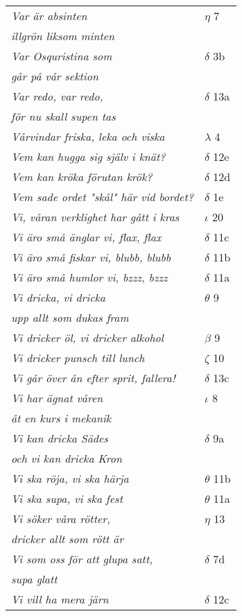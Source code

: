 \documentclass[a6paper,10pt]{article}
\begin{document}
\newpage
\setlength{\oddsidemargin}{-0.47in}
\begin{table}[!h]
\begin{tabular}{l l}
\textit{Var är absinten}	&$\eta$ 7\\
\textit{illgrön liksom minten} &\\
\textit{Var Osquristina som}	&$\delta$ 3b\\
\textit{går på vår sektion} &\\
\textit{Var redo, var redo,}	&$\delta$ 13a\\
\textit{för nu skall supen tas} &\\
\textit{Vårvindar friska, leka och viska}	&$\lambda$ 4\\
\textit{Vem kan hugga sig själv i knät?}	&$\delta$ 12e\\
\textit{Vem kan kröka förutan krök?}	&$\delta$ 12d\\
\textit{Vem sade ordet "skål" här vid bordet?}	&$\delta$ 1e\\
\textit{Vi, våran verklighet har gått i kras}&$\iota$ 20\\
\textit{Vi äro små änglar vi, flax, flax}	&$\delta$ 11c\\
\textit{Vi äro små fiskar vi, blubb, blubb}	&$\delta$ 11b\\
\textit{Vi äro små humlor vi, bzzz, bzzz}	&$\delta$ 11a\\
\textit{Vi dricka, vi dricka}	&$\theta$ 9\\
\textit{upp allt som dukas fram} &\\
\textit{Vi dricker öl, vi dricker alkohol}	&$\beta$ 9\\
\textit{Vi dricker punsch till lunch}	&$\zeta$ 10\\
\textit{Vi går över ån efter sprit, fallera!}	&$\delta$ 13c\\
\textit{Vi har ägnat våren}	&$\iota$ 8\\
\textit{åt en kurs i mekanik} &\\
\textit{Vi kan dricka Sädes}	&$\delta$ 9a\\
\textit{och vi kan dricka Kron} &\\
\textit{Vi ska röja, vi ska härja}	&$\theta$ 11b\\
\textit{Vi ska supa, vi ska fest}	&$\theta$ 11a\\
\textit{Vi söker våra rötter,}	&$\eta$ 13\\
\textit{dricker allt som rött är} &\\
\textit{Vi som oss för att glupa satt,}	&$\delta$ 7d\\
\textit{supa glatt} &\\
\textit{Vi vill ha mera järn}	&$\delta$ 12c\\
\end{tabular}
\end{table}
\end{document}
